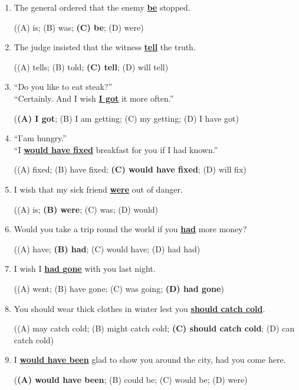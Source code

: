 \documentclass[main.tex]{subfiles}
\begin{document}
\begin{enumerate}[nosep,leftmargin=*]
	\itemsep\eitsp
	\item The general ordered that the enemy \uline{\textbf{be}} stopped.
	
		((A) is; (B) was; \textbf{(C) be}; (D) were)
	\item The judge insisted that the witness \uline{\textbf{tell}} the truth.
	
		((A) tells; (B) told; \textbf{(C) tell}; (D) will tell)
	\item ``Do you like to eat steak?''\\``Certainly. And I wish \uline{\textbf{I got}} it more often.''
	
		(\textbf{(A) I got}; (B) I am getting; (C) my getting; (D) I have got)
	\item ``I'am hungry.''\\``I \uline{\textbf{would have fixed}} breakfast for you if I had known.''
	
		((A) fixed; (B) have fixed; \textbf{(C) would have fixed}; (D) will fix)
	\item I wish that my sick friend \uline{\textbf{were}} out of danger.
	
		((A) is; \textbf{(B) were}; (C) was; (D) would)
	\item Would you take a trip round the world if you \uline{\textbf{had}} more money?
	
		((A) have; \textbf{(B) had}; (C) would have; (D) had had)
	\item I wish I \uline{\textbf{had gone}} with you last night.
	
		((A) went; (B) have gone; (C) was going; \textbf{(D) had gone})
	\item You should wear thick clothes in winter lest you \uline{\textbf{should catch cold}}.
	
		((A) may catch cold; (B) might catch cold; \textbf{(C) should catch cold}; (D) can catch cold)
	\item I \uline{\textbf{would have been}} glad to show you around the city, had you come here.
	
		(\textbf{(A) would have been}; (B) could be; (C) would be; (D) were)
\end{enumerate}
\ 
\end{document}
